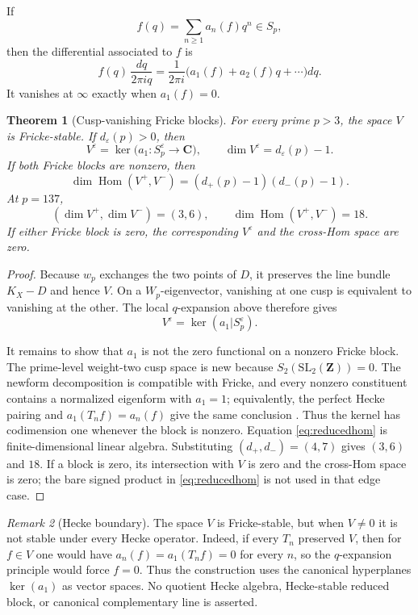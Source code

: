 \documentclass[11pt]{article}
\newtheorem{theorem}{Theorem}[section]
\theoremstyle{definition}
\theoremstyle{remark}
\newtheorem{remark}[theorem]{Remark}
\newcommand{\C}{\mathbf{C}}
\newcommand{\Z}{\mathbf{Z}}
\DeclareMathOperator{\Hom}{Hom}
\begin{document}
If
\[
  f(q)=\sum_{n\geq 1}a_n(f)q^n\in S_p,
\]
then the differential associated to $f$ is
\[
  f(q)\,\frac{dq}{2\pi i q}
  =\frac{1}{2\pi i}\bigl(a_1(f)+a_2(f)q+\cdots\bigr)dq.
\]
It vanishes at $\infty$ exactly when $a_1(f)=0$.

\begin{theorem}[Cusp-vanishing Fricke blocks]\label{thm:cusp-reduced-hom}
For every prime $p>3$, the space $V$ is Fricke-stable.  If
$d_\varepsilon(p)>0$, then
\[
  V^\varepsilon
  =\ker\bigl(a_1:S_p^\varepsilon\longrightarrow\C\bigr),
  \qquad
  \dim V^\varepsilon=d_\varepsilon(p)-1.
\]
If both Fricke blocks are nonzero, then
\begin{equation}\label{eq:reducedhom}
  \dim\Hom(V^+,V^-)
  =(d_+(p)-1)(d_-(p)-1).
\end{equation}
At $p=137$,
\[
  (\dim V^+,\dim V^-)=(3,6),
  \qquad \dim\Hom(V^+,V^-)=18.
\]
If either Fricke block is zero, the corresponding $V^\varepsilon$ and the
cross-Hom space are zero.
\end{theorem}

\begin{proof}
Because $w_p$ exchanges the two points of $D$, it preserves the line bundle
$K_X-D$ and hence $V$.  On a $W_p$-eigenvector, vanishing at one cusp is
equivalent to vanishing at the other.  The local $q$-expansion above therefore
gives
\[
  V^\varepsilon=\ker(a_1|S_p^\varepsilon).
\]

It remains to show that $a_1$ is not the zero functional on a nonzero Fricke
block.  The prime-level weight-two cusp space is new because
$S_2(\mathrm{SL}_2(\Z))=0$.  The newform decomposition is compatible with
Fricke, and every nonzero constituent contains a normalized eigenform with
$a_1=1$; equivalently, the perfect Hecke pairing and
$a_1(T_n f)=a_n(f)$ give the same conclusion
\cite[Lemma~3.22 and Proposition~3.24]{Stein2007}.  Thus the kernel has
codimension one whenever the block is nonzero.  Equation
\eqref{eq:reducedhom} is finite-dimensional linear algebra.  Substituting
$(d_+,d_-)=(4,7)$ gives $(3,6)$ and $18$.  If a block is zero, its intersection
with $V$ is zero and the cross-Hom space is zero; the bare signed product in
\eqref{eq:reducedhom} is not used in that edge case.
\end{proof}

\begin{remark}[Hecke boundary]
The space $V$ is Fricke-stable, but when $V\neq0$ it is not stable under every
Hecke operator.  Indeed, if every $T_n$ preserved $V$, then for $f\in V$ one
would have $a_n(f)=a_1(T_n f)=0$ for every $n$, so the $q$-expansion principle
would force $f=0$.  Thus the construction uses the canonical hyperplanes
$\ker(a_1)$ as vector spaces.  No quotient Hecke algebra, Hecke-stable reduced
block, or canonical complementary line is asserted.
\end{remark}
\end{document}
